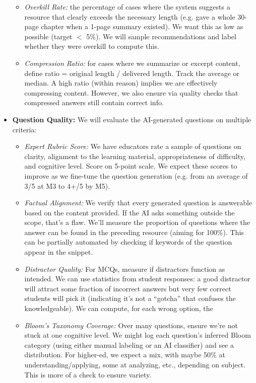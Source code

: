 \documentclass[11pt]{article}
\begin{document}
\begin{itemize}
\begin{itemize}
      \item \textit{Overkill Rate:} the percentage of cases where the system suggests a resource that clearly exceeds the necessary length (e.g. gave a whole 30-page chapter when a 1-page summary existed). We want this as low as possible (target $<$ 5\%). We will sample recommendations and label whether they were overkill to compute this.
      \item \textit{Compression Ratio:} for cases where we summarize or excerpt content, define ratio = original length / delivered length. Track the average or median. A high ratio (within reason) implies we are effectively compressing content. However, we also ensure via quality checks that compressed answers still contain correct info.
    \end{itemize}
  \item \textbf{Question Quality:} We will evaluate the AI-generated questions on multiple criteria:
    \begin{itemize}
      \item \textit{Expert Rubric Score:} We have educators rate a sample of questions on clarity, alignment to the learning material, appropriateness of difficulty, and cognitive level. Score on 5-point scale. We expect these scores to improve as we fine-tune the question generation (e.g. from an average of 3/5 at M3 to 4+/5 by M5).
      \item \textit{Factual Alignment:} We verify that every generated question is answerable based on the content provided. If the AI asks something outside the scope, that’s a flaw. We’ll measure the proportion of questions where the answer can be found in the preceding resource (aiming for 100\%). This can be partially automated by checking if keywords of the question appear in the snippet.
      \item \textit{Distractor Quality:} For MCQs, measure if distractors function as intended. We can use statistics from student responses: a good distractor will attract some fraction of incorrect answers but very few correct students will pick it (indicating it’s not a “gotcha” that confuses the knowledgeable). We can compute, for each wrong option, the %
      \item \textit{Bloom's Taxonomy Coverage:} Over many questions, ensure we’re not stuck at one cognitive level. We might log each question’s inferred Bloom category (using either manual labeling or an AI classifier) and see a distribution. For higher-ed, we expect a mix, with maybe 50\% at understanding/applying, some at analyzing, etc., depending on subject. This is more of a check to ensure variety.

\end{itemize}
\end{itemize}
\end{document}
